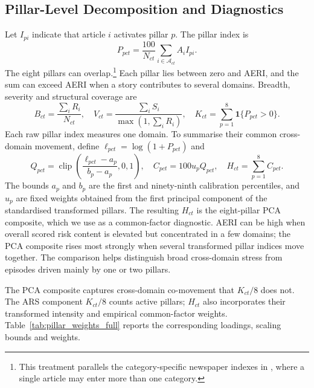 \documentclass[12pt]{article}
\newcommand{\clip}{\operatorname{clip}}
\newcommand{\ind}{\mathbf{1}}
\begin{document}
\subsection{Pillar-Level Decomposition and Diagnostics}\label{sec:pillars_diagnostics}
Let $I_{pi}$ indicate that article $i$ activates pillar $p$. The pillar index is
\begin{equation}P_{pct}=\frac{100}{N_{ct}}\sum_{i\in\mathcal A_{ct}}A_iI_{pi}.\label{eq:pillar}\end{equation}
The eight pillars can overlap.\footnote{This treatment parallels the category-specific newspaper indexes in \citet{baker2016}, where a single article may enter more than one category.} Each pillar lies between zero and AERI, and the sum can exceed AERI when a story contributes to several domains. Breadth, severity and structural coverage are
\begin{equation}B_{ct}=\frac{\sum_iR_i}{N_{ct}},\quad V_{ct}=\frac{\sum_iS_i}{\max(1,\sum_iR_i)},\quad K_{ct}=\sum_{p=1}^{8}\ind\{P_{pct}>0\}.\label{eq:diagnostics}\end{equation}
Each raw pillar index measures one domain. To summarise their common cross-domain movement, define $\ell_{pct}=\log(1+P_{pct})$ and
\begin{equation}Q_{pct}=\clip\left(\frac{\ell_{pct}-a_p}{b_p-a_p},0,1\right),\quad C_{pct}=100u_pQ_{pct},\quad H_{ct}=\sum_{p=1}^{8}C_{pct}.\label{eq:pca_pillars}\end{equation}
The bounds $a_p$ and $b_p$ are the first and ninety-ninth calibration percentiles, and $u_p$ are fixed weights obtained from the first principal component of the standardised transformed pillars. The resulting $H_{ct}$ is the eight-pillar PCA composite, which we use as a common-factor diagnostic. AERI can be high when overall scored risk content is elevated but concentrated in a few domains; the PCA composite rises most strongly when several transformed pillar indices move together. The comparison helps distinguish broad cross-domain stress from episodes driven mainly by one or two pillars.

The PCA composite captures cross-domain co-movement that $K_{ct}/8$ does not. The ARS component $K_{ct}/8$ counts active pillars; $H_{ct}$ also incorporates their transformed intensity and empirical common-factor weights. Table~\ref{tab:pillar_weights_full} reports the corresponding loadings, scaling bounds and weights.
\end{document}
